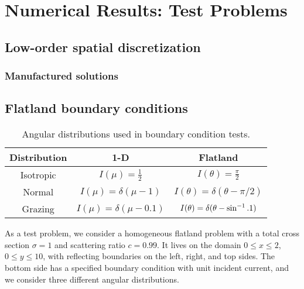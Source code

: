 
\chapter{Numerical Results: Test Problems}\label{chap:simpleNumericalResults}


\section{Low-order spatial discretization}

\subsection{Manufactured solutions}

\section{Flatland boundary conditions}

\begin{table}[htb]
  \centering
  \begin{tabular}{ccc}
\toprule
    Distribution & 1-D & Flatland
\\ \midrule
Isotropic & $I(\mu) = \frac{1}{2}$ & $I(\theta) = \frac{\pi}{2}$
\\
Normal & $I(\mu) = \delta(\mu-1)$ & $I(\theta) = \delta(\theta-\pi/2)$
\\
Grazing & $I(\mu) = \delta(\mu-0.1)$ & $I(\theta) = \delta(\theta-\sin^{-1}.1)$
\\ \bottomrule
  \end{tabular}
  \caption{Angular distributions used in boundary condition tests.}
  \label{tab:angularDistributions}
\end{table}

As a test problem, we consider a homogeneous flatland problem with a
total cross section $\sigma=1$ and scattering ratio $c=0.99$. It lives on the
domain $0 \le x \le 2$, $0 \le y \le 10$, with reflecting boundaries on the left,
right, and top sides. The bottom side has a specified boundary
condition with unit incident current, and we consider three different angular
distributions.

